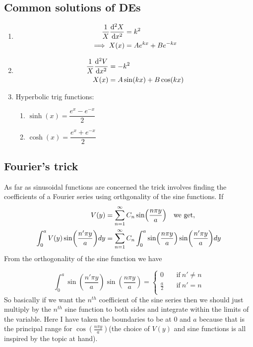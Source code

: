 \documentclass[12pt, oneside]{book}
\begin{document}
\subsection{Common solutions of DEs}
\begin{enumerate}[label=\roman*]
	\item  
	\begin{align}
		   \frac{1}{X}\dv[2]{X}{x}&=k^2 \\
		\implies X(x)&=Ae^{kx}+Be^{-kx}
	    \end{align}
    \item 
    \begin{align}
    	\frac{1}{X}\dv[2]{V}{x}&=-k^2 \\
    	X(x)&=A\sin(kx)+B\cos(kx)
    \end{align}
    \item Hyperbolic trig functions:
    \begin{enumerate}[label=\alph*]
    \item  	$\sinh(x)=\dfrac{e^{x}-e^{-x}}{2}$
    \item   $\cosh(x)=\dfrac{e^{x}+e^{-x}}{2}$
    \end{enumerate}
\end{enumerate}


\subsection{Fourier's trick}\label{fourier}
As far as sinusoidal functions are concerned the trick involves finding the coefficients of a Fourier series using orthgonality of the sine functions. If
\begin{align}
	V(y)&=\sum_{n=1}^{\infty}C_n\sin(\dfrac{n\pi y}{a}) \qq{we get,}\\
	\int_{0}^{a}V(y)\sin(\dfrac{n'\pi y}{a})dy&=\sum_{n=1}^{\infty}C_n\int_{0}^{a}\sin(\dfrac{n\pi y}{a})\sin(\dfrac{n' \pi y}{a})dy
\end{align}
From the orthogonality of the sine function we have

\begin{equation}
	\int_{0}^{a}\sin(\dfrac{n' \pi y}{a})\sin(\dfrac{n\pi y}{a})=\begin{cases}
		0  \quad &\text{if} \ n'\neq n\\
		\frac{a}{2} \quad &\text{if} \ n'=n \\
	\end{cases}
\end{equation}
So basically if we want the $n^{th}$ coefficient of the sine series then we should just multiply by the $n^{th}$ sine function to both sides and integrate within the limits of the variable. Here I have taken the boundaries to be at 0 and $a$ because that is the principal range for $\cos(\frac{n\pi y}{a})$(the choice of $V(y)$ and sine functions is all inspired by the topic at hand).
\end{document}
